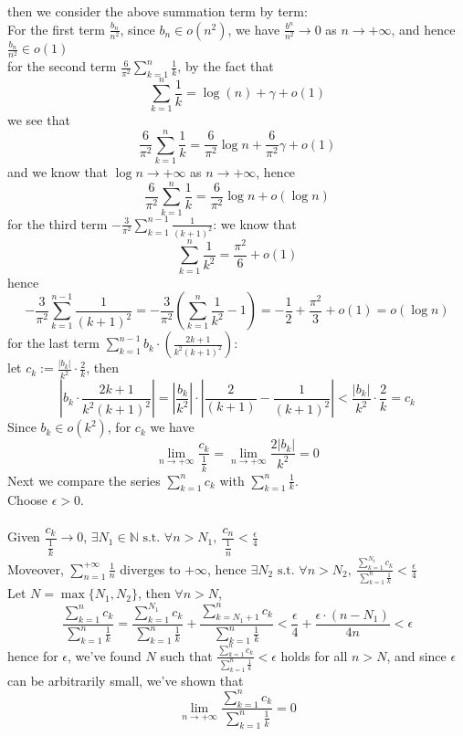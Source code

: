 \documentclass{article}
\def\N{\mathbb{N}}
\def\e{\epsilon}
\def\to{\rightarrow}
\def\oo{\infty}
\def\st{\text{ s.t. } }
\begin{document}
then we consider the above summation term by term:\\
For the first term $\frac{b_n}{n^2}$, since $b_n\in o(n^2)$, we have $\frac{b^n}{n^2}\to 0$ as $n\to +\oo$, and hence $\frac{b_n}{n^2}\in o(1)$\\
for the second term $\frac{ 6 }{\pi^2} \sum_{k=1}^{n}\frac{1 }{k }$, by the fact that 
$$\sum_{k=1}^{n}\frac{1 }{k }=\log(n)+\gamma+o(1)$$
we see that 
$$\frac{6 }{ \pi^2 }\sum_{k=1}^{n}\frac{1 }{k } = \frac{6 }{\pi ^2 } \log n +\frac{6 }{\pi^2 }\gamma+o(1)$$
and we know that $\log n \to +\oo $ as $n\to +\oo$, hence 
$$\frac{ 6 }{\pi^2 } \sum_{k=1}^{n}\frac{1}{k} = \frac{ 6}{ \pi^2 } \log n+ o(\log n)$$
for the third term $-\frac{ 3 }{\pi^2 }\sum_{k=1}^{n-1}\frac{1 }{(k+1)^2}$: we know that 
$$\sum_{k=1}^{n}\frac{ 1 }{k^2 } = \frac{\pi ^2 }{6 } + o(1)$$
hence 
$$-\frac{3}{\pi^2}\sum_{k=1}^{n-1}\frac{1}{(k+1)^2} = -\frac{3}{\pi^2 }\left(\sum_{k=1}^{n}\frac{1 }{k^2 } -1\right) = -\frac{1}{2}+\frac{\pi^2}{3}+o(1)=o(\log n)$$
for the last term $\sum_{k=1}^{n-1}b_k\cdot \left(\frac{2k+1}{k^2(k+1)^2}\right)$:\\
let $c_k:= \frac{|b_k|}{k^2} \cdot \frac{ 2  }{ k }$, then
$$\left|b_k\cdot\frac{2k+1}{k^2(k+1)^2}\right| =\left|\frac{b_k}{k^2}\right|\cdot\left|\frac{2}{(k+1)}-\frac{1}{(k+1)^2}\right| < \frac{|b_k|}{k^2} \cdot \frac{2}{ k} = c_k$$ 
Since $b_k\in o(k^2)$, for $c_k$ we have
$$\lim\limits_{n\to +\oo } \frac{c_k }{\frac{1 }{k} } = \lim\limits_{n\to +\oo }\frac{2|b_k|}{k^2} =0$$
Next we compare the series $\sum_{k=1}^{n}c_k$ with $\sum_{k=1}^{n}\frac{1 }{k}$.\\
Choose $\e>0$.\\\\
Given $\dfrac{c_k }{\frac{1 }{k} } \to 0$, $\exists N_1\in \N \st \forall n>N_1,~ \dfrac{c_n}{\frac{ 1 }{n } } <\frac{\e }{4 } $\\
Moveover, $\sum_{n=1}^{+\oo} \frac{ 1 }{n}$ diverges to $+\oo$, hence $\exists N_2 \st \forall n>N_2,~ \frac{\sum_{k=1}^{N_1}c_k}{\sum_{k=1}^{n}\frac{1 }{k } }<\frac{\e}{4} $\\
Let $N=\max\{N_1, N_2\}$, then $\forall n>N$, 
$$\frac{\sum_{k=1}^{n}c_k  }{\sum_{k=1}^{n}\frac{ 1 }{k } }= \frac{\sum_{k=1}^{N_1}c_k }{\sum_{k=1}^{n }\frac{ 1 }{k}}+\frac{ \sum_{k=N_1+1 }^{n}c_k}{\sum_{k=1}^{n}\frac{ 1 }{k} }<\frac{ \e }{4} +\frac{\e \cdot (n-N_1 )}{4n}<\e $$
hence for $\e$, we've found $N$ such that $\frac{\sum_{k=1}^{n}c_k }{\sum_{k=1}^{n}\frac{ 1}{k } }<\e$ holds for all $n>N$, and since $\e$ can be arbitrarily small, we've shown that 
$$\lim\limits_{ n\to +\oo } \frac{ \sum_{k=1}^{n }c_k }{\sum_{k=1}^{n}\frac{ 1 }{k } }=0$$
\end{document}
